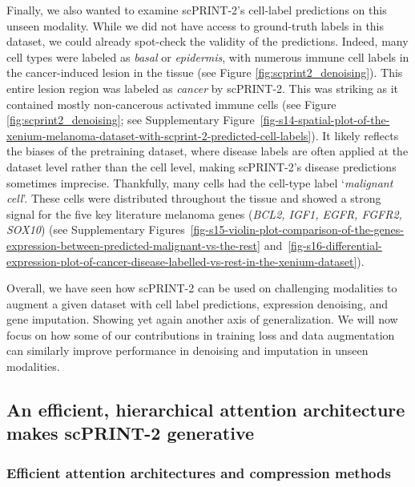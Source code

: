 Finally, we also wanted to examine \gls{scPRINT}-2's cell-label predictions on
this unseen modality. While we did not have access to ground-truth
labels in this dataset, we could already spot-check the validity of the
predictions. Indeed, many cell types were labeled as \emph{basal} or
\emph{epidermis}, with numerous immune cell labels in the cancer-induced
lesion in the tissue (see Figure \ref{fig:scprint2_denoising}). This entire lesion region was
labeled as \emph{cancer} by \gls{scPRINT}-2. This was striking as it contained
mostly non-cancerous activated immune cells (see Figure \ref{fig:scprint2_denoising}; see Supplementary
Figure~\ref{fig-s14-spatial-plot-of-the-xenium-melanoma-dataset-with-scprint-2-predicted-cell-labels}). It likely reflects the biases of the pretraining dataset,
where disease labels are often applied at the dataset level rather than
the cell level, making \gls{scPRINT}-2's disease predictions sometimes
imprecise. Thankfully, many cells had the cell-type label
`\emph{malignant cell}'. These cells were distributed throughout the
tissue and showed a strong signal for the five key literature melanoma
genes (\emph{BCL2, IGF1, EGFR, FGFR2, SOX10}) (see Supplementary Figures~\ref{fig-s15-violin-plot-comparison-of-the-genes-expression-between-predicted-malignant-vs-the-rest} and~\ref{fig-s16-differential-expression-plot-of-cancer-disease-labelled-vs-rest-in-the-xenium-dataset}).

Overall, we have seen how \gls{scPRINT}-2 can be used on challenging
modalities to augment a given dataset with cell label predictions,
expression denoising, and gene imputation. Showing yet again another
axis of generalization. We will now focus on how some of our contributions in training loss and data
augmentation can similarly improve performance in denoising and
imputation in unseen modalities.

\subsection{An efficient, hierarchical attention architecture makes
scPRINT-2
generative}\label{an-efficient-hierarchical-attention-architecture-makes-scprint-2-generative}

\subsubsection{Efficient attention architectures and compression
methods}\label{efficient-attention-architectures-and-compression-methods}

